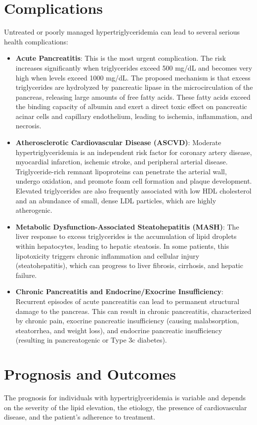 \section*{Complications}
Untreated or poorly managed hypertriglyceridemia can lead to several serious health complications:
\begin{itemize}
    \item \textbf{Acute Pancreatitis}: This is the most urgent complication. The risk increases significantly when triglycerides exceed 500 mg/dL and becomes very high when levels exceed 1000 mg/dL. The proposed mechanism is that excess triglycerides are hydrolyzed by pancreatic lipase in the microcirculation of the pancreas, releasing large amounts of free fatty acids. These fatty acids exceed the binding capacity of albumin and exert a direct toxic effect on pancreatic acinar cells and capillary endothelium, leading to ischemia, inflammation, and necrosis.
    \item \textbf{Atherosclerotic Cardiovascular Disease (ASCVD)}: Moderate hypertriglyceridemia is an independent risk factor for coronary artery disease, myocardial infarction, ischemic stroke, and peripheral arterial disease. Triglyceride-rich remnant lipoproteins can penetrate the arterial wall, undergo oxidation, and promote foam cell formation and plaque development. Elevated triglycerides are also frequently associated with low HDL cholesterol and an abundance of small, dense LDL particles, which are highly atherogenic.
    \item \textbf{Metabolic Dysfunction-Associated Steatohepatitis (MASH)}: The liver response to excess triglycerides is the accumulation of lipid droplets within hepatocytes, leading to hepatic steatosis. In some patients, this lipotoxicity triggers chronic inflammation and cellular injury (steatohepatitis), which can progress to liver fibrosis, cirrhosis, and hepatic failure.
    \item \textbf{Chronic Pancreatitis and Endocrine/Exocrine Insufficiency}: Recurrent episodes of acute pancreatitis can lead to permanent structural damage to the pancreas. This can result in chronic pancreatitis, characterized by chronic pain, exocrine pancreatic insufficiency (causing malabsorption, steatorrhea, and weight loss), and endocrine pancreatic insufficiency (resulting in pancreatogenic or Type 3c diabetes).
\end{itemize}

\section*{Prognosis and Outcomes}
The prognosis for individuals with hypertriglyceridemia is variable and depends on the severity of the lipid elevation, the etiology, the presence of cardiovascular disease, and the patient's adherence to treatment.

